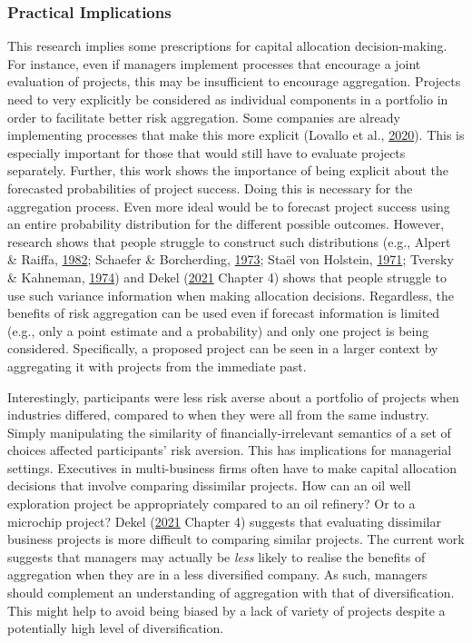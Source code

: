 \documentclass[
  english,
  man, donotrepeattitle,floatsintext]{apa7}
\theoremstyle{definition}
\theoremstyle{definition}
\theoremstyle{definition}
\theoremstyle{definition}
\theoremstyle{remark}
\begin{document}
\hypertarget{practical-implications}{%
\subsubsection{Practical Implications}\label{practical-implications}}

This research implies some prescriptions for capital allocation decision-making.
For instance, even if managers implement processes that encourage a joint
evaluation of projects, this may be insufficient to encourage aggregation.
Projects need to very explicitly be considered as individual components in a
portfolio in order to facilitate better risk aggregation. Some companies are
already implementing processes that make this more explicit (Lovallo et al., \protect\hyperlink{ref-lovallo2020}{2020}). This
is especially important for those that would still have to evaluate projects
separately. Further, this work shows the importance of being explicit about the
forecasted probabilities of project success. Doing this is necessary for the
aggregation process. Even more ideal would be to forecast project success using
an entire probability distribution for the different possible outcomes. However,
research shows that people struggle to construct such distributions (e.g., Alpert \& Raiffa, \protect\hyperlink{ref-alpert1982}{1982}; Schaefer \& Borcherding, \protect\hyperlink{ref-schaefer1973}{1973}; Staël von Holstein, \protect\hyperlink{ref-staelvonholstein1971}{1971}; Tversky \& Kahneman, \protect\hyperlink{ref-tversky1974}{1974}) and
Dekel (\protect\hyperlink{ref-dekel2021b}{2021} Chapter 4) shows that people struggle to use such variance
information when making allocation decisions. Regardless, the benefits of risk
aggregation can be used even if forecast information is limited (e.g., only a
point estimate and a probability) and only one project is being considered.
Specifically, a proposed project can be seen in a larger context by aggregating
it with projects from the immediate past.

Interestingly, participants were less risk averse about a portfolio of projects
when industries differed, compared to when they were all from the same industry.
Simply manipulating the similarity of financially-irrelevant semantics of a set
of choices affected participants' risk aversion. This has implications for
managerial settings. Executives in multi-business firms often have to make
capital allocation decisions that involve comparing dissimilar projects. How can
an oil well exploration project be appropriately compared to an oil refinery? Or
to a microchip project? Dekel (\protect\hyperlink{ref-dekel2021b}{2021} Chapter 4) suggests that evaluating
dissimilar business projects is more difficult to comparing similar projects.
The current work suggests that managers may actually be \emph{less} likely to realise
the benefits of aggregation when they are in a less diversified company. As
such, managers should complement an understanding of aggregation with that of
diversification. This might help to avoid being biased by a lack of variety of
projects despite a potentially high level of diversification.
\end{document}
